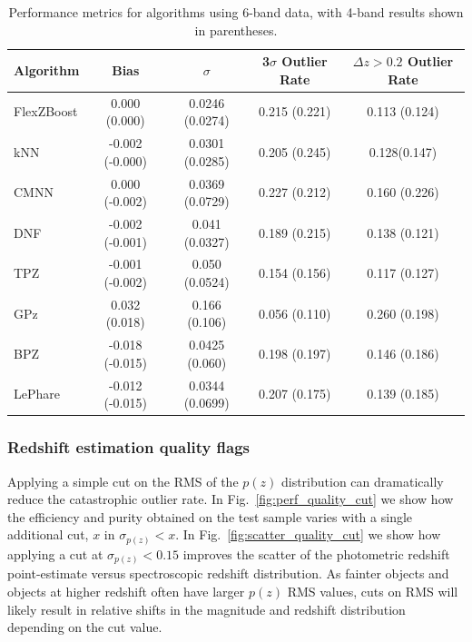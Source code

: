 \begin{table}[ht]
\centering
\caption{Performance metrics for \photoz algorithms using 6-band data, with 4-band results shown in parentheses.}
\begin{tabular}{lcccc}
\hline
\textbf{Algorithm} & \textbf{Bias} & \textbf{$\sigma$} & \textbf{3$\sigma$ Outlier Rate} & \textbf{$\Delta z>0.2$ Outlier Rate} \\
\hline
FlexZBoost & 0.000 (0.000) & 0.0246 (0.0274) & 0.215 (0.221) & 0.113 (0.124) \\
kNN        & -0.002 (-0.000) & 0.0301 (0.0285) & 0.205 (0.245) & 0.128(0.147) \\
CMNN       & 0.000 (-0.002) & 0.0369 (0.0729) & 0.227 (0.212) & 0.160 (0.226) \\
DNF        & -0.002 (-0.001) & 0.041 (0.0327) & 0.189 (0.215) & 0.138 (0.121) \\
TPZ        & -0.001 (-0.002) & 0.050 (0.0524) & 0.154 (0.156) & 0.117 (0.127) \\
GPz        & 0.032 (0.018) & 0.166 (0.106) & 0.056 (0.110) & 0.260 (0.198) \\
BPZ        & -0.018 (-0.015) & 0.0425 (0.060) & 0.198 (0.197) & 0.146 (0.186) \\
LePhare    & -0.012 (-0.015) & 0.0344 (0.0699) & 0.207 (0.175) & 0.139 (0.185) \\
\hline
\end{tabular}
\label{tab:photoz_metrics}
\end{table}



\subsubsection{Redshift estimation quality flags}
\label{sec:performance:pz:flag}

Applying a simple cut on the RMS of the $p(z)$ distribution can dramatically reduce the catastrophic outlier rate.  In Fig.~\ref{fig:perf_quality_cut} we show how the efficiency and purity obtained on the test sample varies with a single additional cut, $x$ in $\sigma_{p(z)} < x$.   In Fig.~\ref{fig:scatter_quality_cut} we show how applying a cut at $\sigma_{p(z)} < 0.15$ improves the scatter of the photometric redshift point-estimate versus spectroscopic redshift distribution.  As fainter objects and objects at higher redshift often have larger $p(z)$ RMS values, cuts on RMS will likely result in relative shifts in the magnitude and redshift distribution depending on the cut value.

